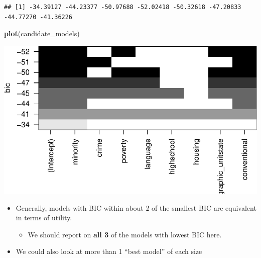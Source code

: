 \documentclass[landscape]{article}
\newenvironment{Shaded}{\begin{snugshade}}{\end{snugshade}}
\newcommand{\KeywordTok}[1]{\textcolor[rgb]{0.13,0.29,0.53}{\textbf{#1}}}
\newcommand{\OperatorTok}[1]{\textcolor[rgb]{0.81,0.36,0.00}{\textbf{#1}}}
\newcommand{\NormalTok}[1]{#1}
\providecommand{\tightlist}{%
  \setlength{\itemsep}{0pt}\setlength{\parskip}{0pt}}
\begin{document}
\begin{Shaded}
\end{Shaded}

\begin{verbatim}
## [1] -34.39127 -44.23377 -50.97688 -52.02418 -50.32618 -47.20833 -44.77270 -41.36226
\end{verbatim}

\begin{Shaded}
\begin{Highlighting}[]
\KeywordTok{plot}\NormalTok{(candidate_models)}
\end{Highlighting}
\end{Shaded}

\includegraphics{20190422_multicollinearity_files/figure-latex/unnamed-chunk-15-1.pdf}

\begin{itemize}
\tightlist
\item
  Generally, models with BIC within about 2 of the smallest BIC are
  equivalent in terms of utility.

  \begin{itemize}
  \tightlist
  \item
    We should report on \textbf{all 3} of the models with lowest BIC
    here.
  \end{itemize}
\item
  We could also look at more than 1 ``best model'' of each size
\end{itemize}
\end{document}
